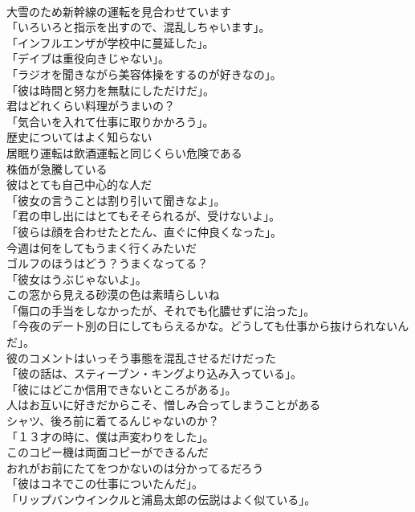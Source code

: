 \documentclass[8pt]{extreport}
\begin{document}
\begin{CJK}{UTF8}{min}
\\	大雪のため新幹線の運転を見合わせています	
\\	「いろいろと指示を出すので、混乱しちゃいます」。	
\\	「インフルエンザが学校中に蔓延した」。	
\\	「デイブは重役向きじゃない」。	
\\	「ラジオを聞きながら美容体操をするのが好きなの」。	
\\	「彼は時間と努力を無駄にしただけだ」。	
\\	君はどれくらい料理がうまいの？	
\\	「気合いを入れて仕事に取りかかろう」。	
\\	歴史についてはよく知らない	
\\	居眠り運転は飲酒運転と同じくらい危険である	
\\	株価が急騰している	
\\	彼はとても自己中心的な人だ	
\\	「彼女の言うことは割り引いて聞きなよ」。	
\\	「君の申し出にはとてもそそられるが、受けないよ」。	
\\	「彼らは顔を合わせたとたん、直ぐに仲良くなった」。	
\\	今週は何をしてもうまく行くみたいだ	
\\	ゴルフのほうはどう？うまくなってる？	
\\	「彼女はうぶじゃないよ」。	
\\	この窓から見える砂漠の色は素晴らしいね	
\\	「傷口の手当をしなかったが、それでも化膿せずに治った」。	
\\	「今夜のデート別の日にしてもらえるかな。どうしても仕事から抜けられないんだ」。	
\\	彼のコメントはいっそう事態を混乱させるだけだった	
\\	「彼の話は、スティーブン・キングより込み入っている」。	
\\	「彼にはどこか信用できないところがある」。	
\\	人はお互いに好きだからこそ、憎しみ合ってしまうことがある	
\\	シャツ、後ろ前に着てるんじゃないのか？	
\\	「１３才の時に、僕は声変わりをした」。	
\\	このコピー機は両面コピーができるんだ	
\\	おれがお前にたてをつかないのは分かってるだろう	
\\	「彼はコネでこの仕事についたんだ」。	
\\	「リップバンウインクルと浦島太郎の伝説はよく似ている」。	

\end{CJK}
\end{document}
